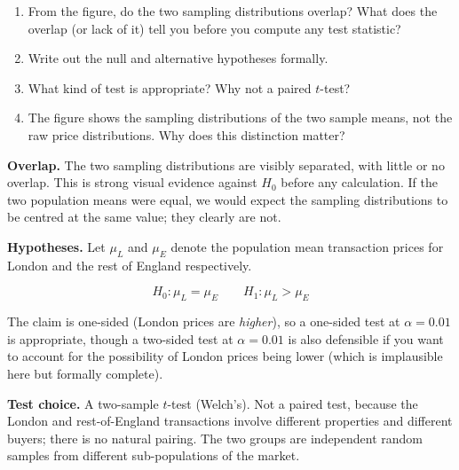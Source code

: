\documentclass[
  letterpaper,
  11pt,
  twoside,
  openany]{scrbook}
\providecommand{\tightlist}{%
  \setlength{\itemsep}{0pt}\setlength{\parskip}{0pt}}
\begin{document}
\begin{enumerate}
\def\labelenumi{\arabic{enumi}.}
\tightlist
\item
  From the figure, do the two sampling distributions overlap? What does
  the overlap (or lack of it) tell you before you compute any test
  statistic?
\item
  Write out the null and alternative hypotheses formally.
\item
  What kind of test is appropriate? Why not a paired \(t\)-test?
\item
  The figure shows the sampling distributions of the two sample means,
  not the raw price distributions. Why does this distinction matter?
\end{enumerate}

\begin{tcolorbox}[enhanced jigsaw, arc=.35mm, bottomrule=.15mm, bottomtitle=1mm, breakable, colback=white, colbacktitle=quarto-callout-note-color!10!white, colframe=quarto-callout-note-color-frame, coltitle=black, left=2mm, leftrule=.75mm, opacityback=0, opacitybacktitle=0.6, rightrule=.15mm, title=\textcolor{quarto-callout-note-color}{\faInfo}\hspace{0.5em}{Solution to Problem 10}, titlerule=0mm, toprule=.15mm, toptitle=1mm]

\textbf{Overlap.} The two sampling distributions are visibly separated,
with little or no overlap. This is strong visual evidence against
\(H_0\) before any calculation. If the two population means were equal,
we would expect the sampling distributions to be centred at the same
value; they clearly are not.

\textbf{Hypotheses.} Let \(\mu_L\) and \(\mu_E\) denote the population
mean transaction prices for London and the rest of England respectively.

\[H_0: \mu_L = \mu_E \qquad H_1: \mu_L > \mu_E\]

The claim is one-sided (London prices are \emph{higher}), so a one-sided
test at \(\alpha = 0.01\) is appropriate, though a two-sided test at
\(\alpha = 0.01\) is also defensible if you want to account for the
possibility of London prices being lower (which is implausible here but
formally complete).

\textbf{Test choice.} A two-sample \(t\)-test (Welch's). Not a paired
test, because the London and rest-of-England transactions involve
different properties and different buyers; there is no natural pairing.
The two groups are independent random samples from different
sub-populations of the market.


\end{tcolorbox}
\end{document}
